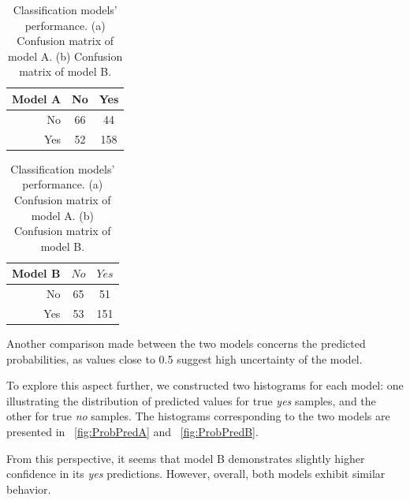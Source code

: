 \begin{table}[h]
	\begin{subtable}{0.4\textwidth}
		\centering
		\begin{tabular}{|| cr | cc ||}    
			\hline
			\multicolumn{2}{|c|}{Model A} 
			& No & Yes \\
			\hline
			\hline
			& No & 66 & 44 \\
			& Yes & 52 & 158 \\
			\hline
		\end{tabular}
		\caption{}
		\label{table:ConfMatModA}
	\end{subtable}
	\hfill
	\begin{subtable}{0.4\textwidth}
		\centering
		\begin{tabular}{|| cr | cc ||}    
			\hline
			\multicolumn{2}{|c|}{Model B} 
			& $No$ & $Yes$ \\
			\hline
			\hline
			& No & 65 & 51 \\
			& Yes & 53 & 151 \\
			\hline
		\end{tabular}
		\caption{}
		\label{table:ConfMatModA}
	\end{subtable}
	\caption{Classification models' performance. (a) Confusion matrix of model A. (b) Confusion matrix of model B.}
	\label{table:ConfMat}
\end{table}


Another comparison made between the two models concerns the predicted probabilities, as values close to 0.5 suggest high uncertainty of the model.

To explore this aspect further, we constructed two histograms for each model: one illustrating the distribution of predicted values for true \textit{yes} samples, and the other for true \textit{no} samples. The histograms corresponding to the two models are presented in \Fig~\ref{fig:ProbPredA} and \Fig~\ref{fig:ProbPredB}. 

From this perspective, it seems that model B demonstrates slightly higher confidence in its \textit{yes} predictions. However, overall, both models exhibit similar behavior.

